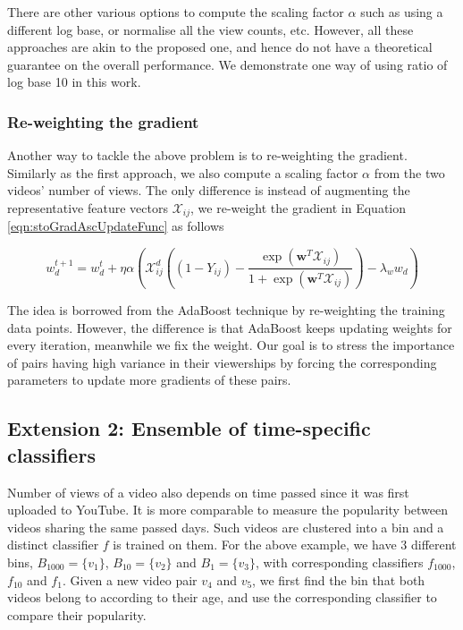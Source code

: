 There are other various options to compute the scaling factor $\alpha$ such as using a different log base, or normalise all the view counts, etc. However, all these approaches are akin to the proposed one, and hence do not have a theoretical guarantee on the overall performance. We demonstrate one way of using ratio of log base 10 in this work.

\subsubsection{Re-weighting the gradient}
Another way to tackle the above problem is to re-weighting the gradient. Similarly as the first approach, we also compute a scaling factor $\alpha$ from the two videos' number of views. The only difference is instead of augmenting the representative feature vectors $\mathcal{X}_{ij}$, we re-weight the gradient in Equation \ref{eqn:stoGradAscUpdateFunc} as follows

	\begin{equation}
	w^{t+1}_d = w^t_d + \eta \alpha (\mathcal{X}_{ij}^d ( (1 - Y_{ij}) - \frac{\exp(\textbf{w}^T\mathcal{X}_{ij})}{1 + \exp(\textbf{w}^T\mathcal{X}_{ij})})  - \lambda_w w_d)
	\label{eqn:stoGradAscUpdateFuncGeneric}
	\end{equation}

	The idea is borrowed from the AdaBoost technique by re-weighting the training data points. However, the difference is that AdaBoost keeps updating weights for every iteration, meanwhile we fix the weight. Our goal is to stress the importance of pairs having high variance in their viewerships by forcing the corresponding parameters to update more gradients of these pairs. 
	 
\subsection{Extension 2: Ensemble of time-specific classifiers}
\label{subsec:ext2}
Number of views of a video also depends on time passed since it was first uploaded to YouTube. It is more comparable to measure the popularity between videos sharing the same passed days. Such videos are clustered into a bin and a distinct classifier $f$ is trained on them. For the above example, we have 3 different bins, $B_{1000}=\{v_1\}$, $B_{10}=\{v_2\}$ and $B_{1}=\{v_3\}$, with corresponding classifiers $f_{1000}$, $f_{10}$ and $f_{1}$. Given a new video pair $v_4$ and $v_5$, we first find the bin that both videos belong to according to their age, and use the corresponding classifier to compare their popularity. 

